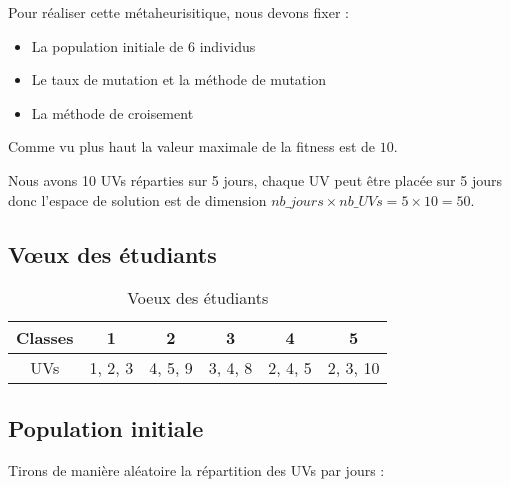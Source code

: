 
Pour réaliser cette métaheurisitique, nous devons fixer :
\begin{itemize}
    \item La population initiale de 6 individus
    \item Le taux de mutation et la méthode de mutation
    \item La méthode de croisement
\end{itemize}

Comme vu plus haut la valeur maximale de la fitness est de $10$.

Nous avons 10 UVs réparties sur 5 jours, chaque UV peut être placée sur 5 jours donc l'espace de solution est de dimension $nb\_jours \times nb\_UVs = 5 \times 10 = 50$.

\subsection{V\oe ux des étudiants}\label{subsec:voeux-des-etudiants}


\begin{table}[!h]
    \centering
    \begin{tabular}{|c|c|c|c|c|c|}
        \hline
        Classes & 1       & 2       & 3       & 4       & 5        \\
        \hline
        UVs     & 1, 2, 3 & 4, 5, 9 & 3, 4, 8 & 2, 4, 5 & 2, 3, 10 \\
        \hline
    \end{tabular}
    \caption{Voeux des étudiants}\label{tab:voeux-etudiant}
\end{table}

\subsection{Population initiale}\label{subsec:population-initiale}

Tirons de manière aléatoire la répartition des UVs par jours :


